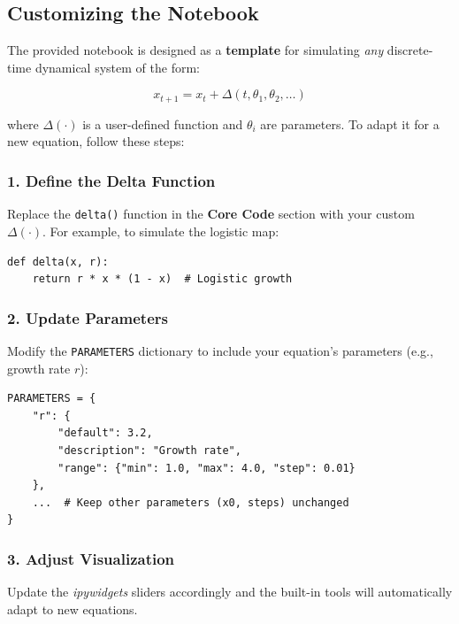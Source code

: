 \documentclass[a4paper, 10pt]{article}
\begin{document}
\subsection{Customizing the Notebook}
The provided notebook is designed as a \textbf{template} for simulating \textit{any} discrete-time dynamical system of the form:

\begin{equation}  
x_{t+1} = x_t + \Delta(t, \theta_1, \theta_2, \dots)  
\end{equation}

where \(\Delta(\cdot)\) is a user-defined function and \(\theta_i\) are parameters. To adapt it for a new equation, follow these steps:

\subsubsection*{1. Define the Delta Function}
Replace the \texttt{delta()} function in the \textbf{Core Code} section with your custom \(\Delta(\cdot)\). For example, to simulate the logistic map:

\begin{verbatim}
def delta(x, r):
    return r * x * (1 - x)  # Logistic growth
\end{verbatim}

\vspace{-1.5em}

\subsubsection*{2. Update Parameters}
Modify the \texttt{PARAMETERS} dictionary to include your equation's parameters (e.g., growth rate \(r\)):

\begin{verbatim}
PARAMETERS = {
    "r": {
        "default": 3.2,
        "description": "Growth rate",
        "range": {"min": 1.0, "max": 4.0, "step": 0.01}
    },
    ...  # Keep other parameters (x0, steps) unchanged
}
\end{verbatim}

\vspace{-1.5em}

\subsubsection*{3. Adjust Visualization}
Update the \textit{ipywidgets} sliders accordingly and the built-in tools will automatically adapt to new equations.
\end{document}
